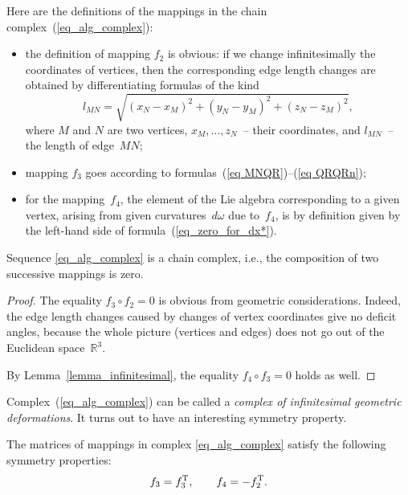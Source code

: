 Here are the def\/initions of the mappings in the chain complex~(\ref{eq_alg_complex}):
\begin{itemize}
\itemsep=0pt
\item the def\/inition of mapping $f_2$ is obvious: if we change inf\/initesimally the coordinates of vertices, then the corresponding edge length changes are obtained by dif\/ferentiating formulas of the kind
\begin{equation}
l_{MN} = \sqrt{(x_N-x_M)^2+(y_N-y_M)^2+(z_N-z_M)^2},
\label{eq_1a}
\end{equation}
where $M$ and $N$ are two vertices, $x_M,\ldots,z_N$~-- their coordinates, and $l_{MN}$~-- the length of edge~$MN$;
\item mapping $f_3$ goes according to formulas~(\ref{eq MNQR})--(\ref{eq QRQRn});
\item for the mapping~$f_4$, the element of the Lie algebra corresponding to a given vertex, arising from given curvatures~$d\omega$ due to~$f_4$, is by def\/inition given by the left-hand side of formula~(\ref{eq_zero_for_dx*}).
\end{itemize}


\begin{theorem}
Sequence \eqref{eq_alg_complex} is a chain complex, i.e., the composition of two successive mappings is zero.
\label{th2}
\end{theorem}

\begin{proof}
The equality $f_3 \circ f_2 = 0$ is obvious from geometric considerations. Indeed, the edge length changes caused by changes of vertex coordinates give no def\/icit angles, because the whole picture (vertices and edges) does not go out of the Euclidean space~$\mathbb R^3$.

By Lemma~\ref{lemma_infinitesimal}, the equality $f_4 \circ f_3 = 0$ holds as well.
\end{proof}

Complex~(\ref{eq_alg_complex}) can be called a \emph{complex of infinitesimal geometric deformations}. It turns out to have an interesting symmetry property.
\begin{theorem}\label{th_symmetry}
The matrices of mappings in complex \eqref{eq_alg_complex} satisfy the following symmetry properties:
\begin{equation}
f_3 = f_3^{\rm T},\qquad f_4 = - f_2^{\rm T}.
\label{eq_symmetry}
\end{equation}
\end{theorem}

